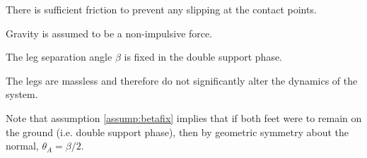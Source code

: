 \begin{assumption}
	There is sufficient friction to prevent any slipping at the contact points. 
\end{assumption}

\begin{assumption}
	Gravity is assumed to be a non-impulsive force. 
\end{assumption}

\begin{assumption} \label{assump:betafix}
	The leg separation angle $\beta$ is fixed in the double support phase.
\end{assumption}

\begin{assumption} \label{assump:massless}
	The legs are massless and therefore do not significantly alter the dynamics of the system. 
\end{assumption}

\hrulefill

Note that assumption \ref{assump:betafix} implies that if both feet were to remain on the ground (i.e. double support phase), then by geometric symmetry about the normal, $\theta _A = \beta/2$. 

